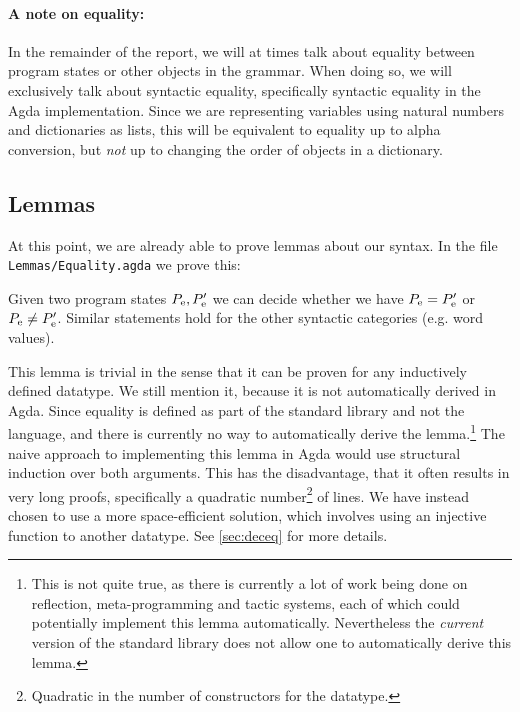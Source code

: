 \paragraph{A note on equality:}
In the remainder of the report, we will at times talk about equality between
program states or other objects in the grammar. When doing so, we will
exclusively talk about syntactic equality, specifically syntactic equality in
the Agda implementation. Since we are representing variables using natural
numbers and dictionaries as lists, this will be equivalent to equality up to
alpha conversion, but \emph{not} up to changing the order of objects in a
dictionary.

\subsection{Lemmas}
\label{sec:equality}

At this point, we are already able to prove lemmas about our syntax. In the file
\texttt{Lemmas/Equality.agda} we prove this:

\begin{lemma}
  Given two program states $P_{\mathrm{e}}, P'_{\mathrm{e}}$ we can decide whether we
  have $P_{\mathrm{e}} = P'_{\mathrm{e}}$ or $P_{\mathrm{e}} \neq P'_{\mathrm{e}}$. Similar
  statements hold for the other syntactic categories (e.g. word values).
\end{lemma}

This lemma is trivial in the sense that it can be proven for any inductively
defined datatype. We still mention it, because it is not automatically derived
in Agda. Since equality is defined as part of the standard library and not the
language, and there is currently no way to automatically derive the
lemma.\footnote{This is not quite true, as there is currently a lot of work
  being done on reflection, meta-programming and tactic systems, each of which
  could potentially implement this lemma automatically. Nevertheless the
  \emph{current} version of the standard library does not allow one to
  automatically derive this lemma.} The naive approach to implementing this
lemma in Agda would use structural induction over both arguments. This has the
disadvantage, that it often results in very long proofs, specifically a
quadratic number\footnote{Quadratic in the number of constructors for the
  datatype.} of lines. We have instead chosen to use a more space-efficient
solution, which involves using an injective function to another datatype. See
\cref{sec:deceq} for more details.

